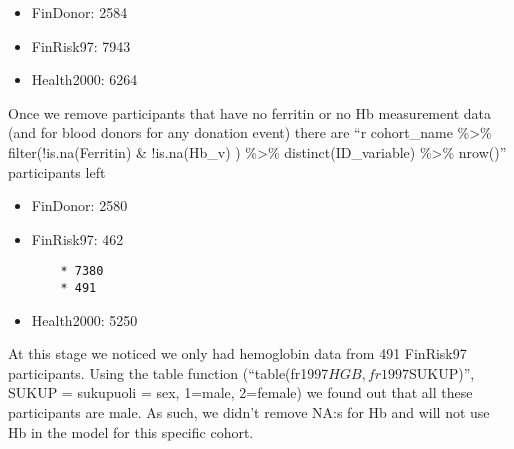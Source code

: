 \documentclass[
]{article}
\providecommand{\tightlist}{%
  \setlength{\itemsep}{0pt}\setlength{\parskip}{0pt}}
\begin{document}
\begin{itemize}
\tightlist
\item
  FinDonor: 2584
\item
  FinRisk97: 7943
\item
  Health2000: 6264
\end{itemize}

Once we remove participants that have no ferritin or no Hb measurement
data (and for blood donors for any donation event) there are ``r
cohort\_name \%\textgreater\% filter(!is.na(Ferritin) \& !is.na(Hb\_v) )
\%\textgreater\% distinct(ID\_variable) \%\textgreater\% nrow()''
participants left

\begin{itemize}
\item
  FinDonor: 2580
\item
  FinRisk97: 462

\begin{verbatim}
    * 7380
    * 491
\end{verbatim}
\item
  Health2000: 5250
\end{itemize}

At this stage we noticed we only had hemoglobin data from 491 FinRisk97
participants. Using the table function
(``table(fr1997\(HGB, fr1997\)SUKUP)'', SUKUP = sukupuoli = sex, 1=male,
2=female) we found out that all these participants are male. As such, we
didn't remove NA:s for Hb and will not use Hb in the model for this
specific cohort.
\end{document}
